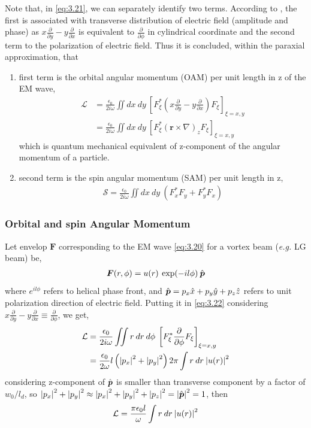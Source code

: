 \documentclass[11pt,a4paper]{article}
\numberwithin{equation}{section}
\begin{document}
Note that, in \ref{eq:3.21}, we can separately identify two terms. According to \cite{WO}, the first is associated with transverse distribution of electric field (amplitude and phase) as 
$x\frac{\partial}{\partial y} - y\frac{\partial}{\partial x}$
is equivalent to $\frac{\partial}{\partial\phi}$ in cylindrical coordinate and the second term to the polarization of electric field. Thus it is concluded,\cite{enk nien 92} within the paraxial approximation, that
\begin{enumerate}
	\item 
	first term is the orbital angular momentum (OAM) per unit length in z of the EM wave,
	\begin{align}
		\mathcal{L} &= \frac{\epsilon_0}{2i\omega} \iint dx\:dy\:\left[F_\xi^\ast\left(x\frac{\partial}{\partial y} - y\frac{\partial}{\partial x}\right)F_\xi\right]_{\xi=x,y}\nonumber\\
		&=\frac{\epsilon_0}{2i\omega} \iint dx\:dy\:\left[F_\xi^\ast\left(\boldsymbol{r}\times\nabla\right)_zF_\xi\right]_{\xi=x,y}\label{eq:3.22}
	\end{align}
	which is quantum mechanical equivalent of z-component of the angular momentum of a particle.
	
	\item 
	second term is the spin angular momentum (SAM) per unit length in z,
	\begin{align}
		\mathcal{S} = \frac{\epsilon_0}{2i\omega}\iint dx\:dy\: (F_x^\ast F_y + F_y^\ast F_x) \label{eq:3.23}
	\end{align}
\end{enumerate}
\subsubsection{Orbital and spin Angular Momentum}
Let envelop $\boldsymbol{F}$ corresponding to the EM wave \ref{eq:3.20} for a vortex beam (\textit{e.g.} LG beam) be,
\begin{align}
	\boldsymbol{F}(r,\phi)= u(r)\:\exp(-il\phi)\:\Hat{\boldsymbol{p}}
\end{align} where $e^{il\phi}$ refers to helical phase front, and $\Hat{\boldsymbol{p}} = p_x\Hat{x}+ p_y\Hat{y}+p_z\Hat{z}$ refers to unit polarization direction of electric field. Putting it in \ref{eq:3.22} considering $x\frac{\partial}{\partial y} - y\frac{\partial}{\partial x} \equiv \frac{\partial}{\partial\phi}$, we get,
\begin{align}
	\mathcal{L}&=\frac{\epsilon_0}{2i\omega} \iint r\:dr\:d\phi\:\left[F_\xi^\ast\frac{\partial}{\partial\phi}F_\xi\right]_{\xi=x,y}\nonumber\\
	&= 	\frac{\epsilon_0}{2\omega} l \left(\abs{p_x}^2+\abs{p_y}^2\right)2\pi \int r\:dr\:\abs{u(r)}^2 \nonumber
\end{align}
considering z-component of $\Hat{\boldsymbol{p}}$ is smaller than transverse component by a factor of $w_0/l_d$, so $\abs{p_x}^2+\abs{p_y}^2 \approx \abs{p_x}^2+\abs{p_y}^2+\abs{p_z}^2 = \abs{\Hat{\boldsymbol{p}}}^2 = 1$, then
\begin{align}
	\mathcal{L}=\frac{\pi\epsilon_0l}{\omega}\int r\:dr\:\abs{u(r)}^2 \label{eq:3.25}
\end{align}
\end{document}

